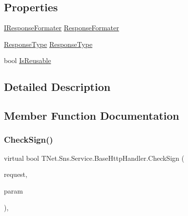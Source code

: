 \subsection*{Properties}
\begin{DoxyCompactItemize}
\item 
\mbox{\hyperlink{interface_t_net_1_1_sns_1_1_service_1_1_i_response_formater}{I\+Response\+Formater}} \mbox{\hyperlink{class_t_net_1_1_sns_1_1_service_1_1_base_http_handler_af114c540aaa94654298d945e37b5f9b6}{Response\+Formater}}
\item 
\mbox{\hyperlink{namespace_t_net_1_1_sns_1_1_service_ac6e96f45529b532afd48a137e408ce35}{Response\+Type}} \mbox{\hyperlink{class_t_net_1_1_sns_1_1_service_1_1_base_http_handler_a40a29599cba9fe1bee4b189d5700f3d9}{Response\+Type}}
\item 
bool \mbox{\hyperlink{class_t_net_1_1_sns_1_1_service_1_1_base_http_handler_a242d960fdfeafdec3be33e344f5a5802}{Is\+Reusable}}
\end{DoxyCompactItemize}


\subsection{Detailed Description}




\subsection{Member Function Documentation}
\mbox{\label{class_t_net_1_1_sns_1_1_service_1_1_base_http_handler_af83c27783bc3aefefb3e146a74d4f4eb}} 
\subsubsection{\texorpdfstring{Check\+Sign()}{CheckSign()}\hspace{0.1cm}{\footnotesize\ttfamily [1/2]}}
{\footnotesize\ttfamily virtual bool T\+Net.\+Sns.\+Service.\+Base\+Http\+Handler.\+Check\+Sign (\begin{DoxyParamCaption}\item[{Http\+Request}]{request,  }\item[{out string}]{param }\end{DoxyParamCaption})\hspace{0.3cm}{\ttfamily [protected]}, {\ttfamily [virtual]}}






